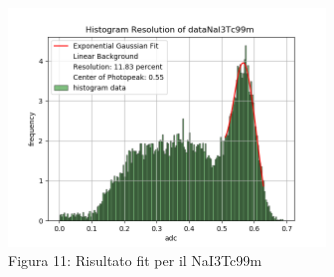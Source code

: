 \documentclass[a4paper]{article}
\begin{document}
\begin{figure}[H]
\centering
\includegraphics[width=0.75\textwidth]{histdataNaI3Tc99m}
\caption{Figura 11: Risultato fit per il NaI3Tc99m}
\end{figure}
\end{document}
